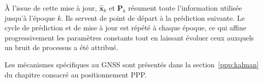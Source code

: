 À l'issue de cette mise à jour, $\widehat{\mathbf x}_k$ et $\mathbf P_k$
résument toute l'information utilisée jusqu'à l'époque $k$. Ils servent de
point de départ à la prédiction suivante. Le cycle de prédiction et de mise à
jour est répété à chaque époque, ce qui affine progressivement les
paramètres constants tout en laissant évoluer ceux auxquels un bruit de
processus a été attribué.

Les mécanismes spécifiques au GNSS sont présentés dans la
section~\ref{ppp:kalman} du chapitre consacré au positionnement PPP.
